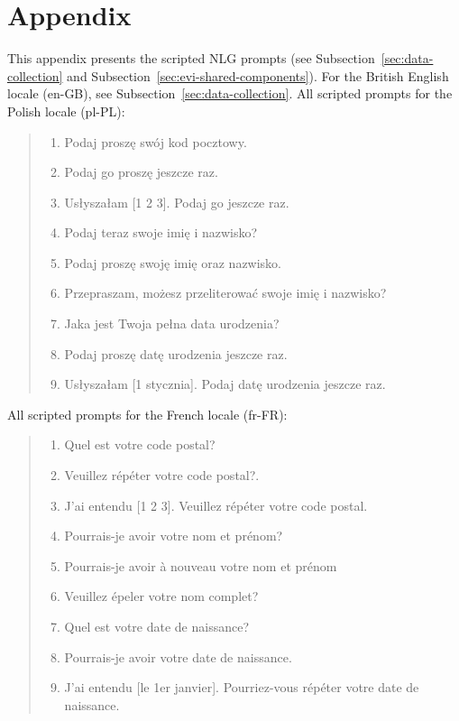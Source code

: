 \documentclass[11pt]{article}
\begin{document}
{
\appendix


\renewcommand{\thesection}{\Alph{section}}


\section{Appendix}
\label{sec:appendix-qs}

This appendix
presents the scripted NLG prompts
(see Subsection~\ref{sec:data-collection} and Subsection~\ref{sec:evi-shared-components}).
For the British English locale (en-GB), see Subsection~\ref{sec:data-collection}.
All scripted prompts for the Polish locale (pl-PL):
\begin{quote}
{\small
\begin{enumerate}[label=Q\arabic*:,align=left, leftmargin=15pt]
    \item Podaj proszę swój kod pocztowy.
    \item Podaj go proszę jeszcze raz.
    \item Usłyszałam [1 2 3]. Podaj go jeszcze raz.
    \item Podaj teraz swoje imię i nazwisko?
    \item Podaj proszę swoję imię oraz nazwisko.
    \item Przepraszam, możesz przeliterować swoje imię i nazwisko?
    \item Jaka jest Twoja pełna data urodzenia?
    \item Podaj proszę datę urodzenia jeszcze raz.
    \item Usłyszałam [1 stycznia]. Podaj datę urodzenia jeszcze raz.
\end{enumerate}}
\end{quote}
All scripted prompts for the French locale \!(fr-FR):
\begin{quote}
{\small
\begin{enumerate}[label=Q\arabic*:,align=left, leftmargin=15pt, rightmargin=-10pt]
    \item Quel est votre code postal?
    \item Veuillez répéter votre code postal?.
    \item J'ai entendu [1 2 3]. Veuillez répéter votre code postal.
    \item Pourrais-je avoir votre nom et prénom?
    \item Pourrais-je avoir à nouveau votre nom et prénom
    \item Veuillez épeler votre nom complet?
    \item Quel est votre date de naissance?
    \item Pourrais-je avoir votre date de naissance.
    \item J'ai entendu [le 1er janvier]. Pourriez-vous répéter votre date de naissance.
\end{enumerate}}
\end{quote}



}
\end{document}
